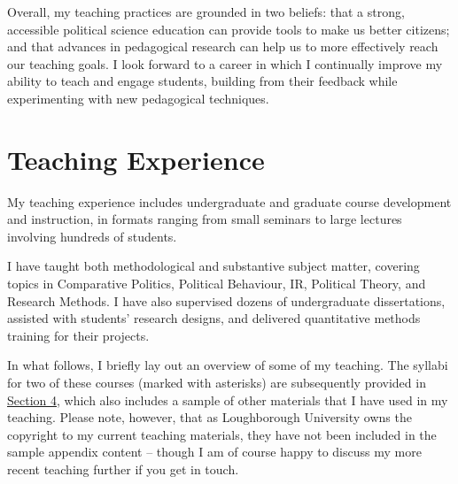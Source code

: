 \documentclass[11pt]{article}
\begin{document}
Overall, my teaching practices are grounded in two beliefs: that a strong, accessible political science education can provide tools to make us better citizens; and that advances in pedagogical research can help us to more effectively reach our teaching goals. I look forward to a career in which I continually improve my ability to teach and engage students, building from their feedback while experimenting with new pedagogical techniques. 

\section{ Teaching Experience}

My teaching experience includes undergraduate and graduate course development and instruction, in formats ranging from small seminars to large lectures involving hundreds of students. 

I have taught both methodological and substantive subject matter, covering topics in Comparative Politics, Political Behaviour, IR, Political Theory, and Research Methods. I have also supervised dozens of undergraduate dissertations, assisted with students' research designs, and delivered quantitative methods training for their projects. 

In what follows, I briefly lay out an overview of some of my teaching. The syllabi for two of these courses (marked with asterisks) are subsequently provided in \hyperref[sec:materials]{Section 4}, which also includes a sample of other materials that I have used in my teaching. Please note, however, that as Loughborough University owns the copyright to my current teaching materials, they have not been included in the sample appendix content -- though I am of course happy to discuss my more recent teaching further if you get in touch. 
\end{document}
